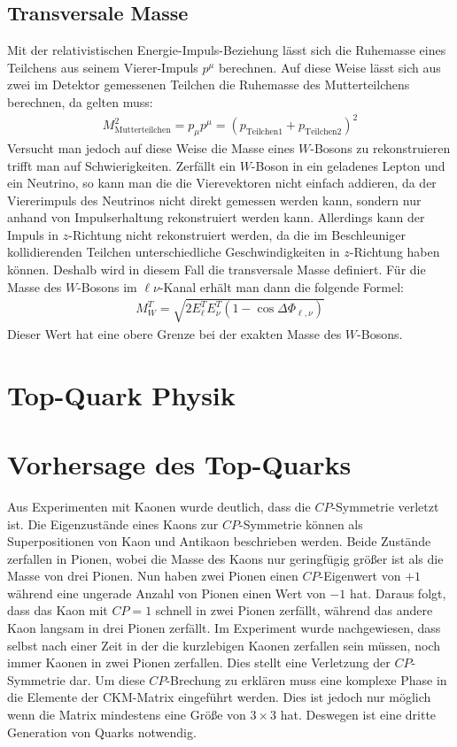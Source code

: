 \subsection{Transversale Masse}
Mit der relativistischen Energie-Impuls-Beziehung lässt sich die Ruhemasse eines Teilchens aus seinem Vierer-Impuls $p^\mu$ berechnen. Auf diese Weise lässt sich aus zwei im Detektor gemessenen Teilchen die Ruhemasse des Mutterteilchens berechnen, da gelten muss:
\begin{align*}
M_{\text{Mutterteilchen}}^2 = p_\mu p^\mu = (p_{\text{Teilchen} 1}+p_{\text{Teilchen} 2})^2
\end{align*}
Versucht man jedoch auf diese Weise die Masse eines $W$-Bosons zu rekonstruieren trifft man auf Schwierigkeiten. Zerfällt ein $W$-Boson in ein geladenes Lepton und ein Neutrino, so kann man die die Vierevektoren nicht einfach addieren, da der Viererimpuls des Neutrinos nicht direkt gemessen werden kann, sondern nur anhand von Impulserhaltung rekonstruiert werden kann. Allerdings kann der Impuls in $z$-Richtung nicht rekonstruiert werden, da die im Beschleuniger kollidierenden Teilchen unterschiedliche Geschwindigkeiten in $z$-Richtung haben können. Deshalb wird in diesem Fall die transversale Masse definiert. Für die Masse des $W$-Bosons im $\ell \nu$-Kanal erhält man dann die folgende Formel:
\begin{align*}
M_W^T = \sqrt{2E_{\ell}^TE_\nu^T\left(1-\cos \Delta\Phi_{\ell,\nu}\right)}
\end{align*}
Dieser Wert hat eine obere Grenze bei der exakten Masse des $W$-Bosons.

\section{Top-Quark Physik}
\section{Vorhersage des Top-Quarks}
Aus Experimenten mit Kaonen wurde deutlich, dass die $CP$-Symmetrie verletzt ist. Die Eigenzustände eines Kaons zur $CP$-Symmetrie können als Superpositionen von Kaon und Antikaon beschrieben werden. Beide Zustände zerfallen in Pionen, wobei die Masse des Kaons nur geringfügig größer ist als die Masse von drei Pionen. Nun haben zwei Pionen einen $CP$-Eigenwert von $+1$ während eine ungerade Anzahl von Pionen einen Wert von $-1$ hat. Daraus folgt, dass das Kaon mit $CP=1$ schnell in zwei Pionen zerfällt, während das andere Kaon langsam in drei Pionen zerfällt. Im Experiment wurde nachgewiesen, dass selbst nach einer Zeit in der die kurzlebigen Kaonen zerfallen sein müssen, noch immer Kaonen in zwei Pionen zerfallen. Dies stellt eine Verletzung der $CP$-Symmetrie dar. Um diese $CP$-Brechung zu erklären muss eine komplexe Phase in die Elemente der CKM-Matrix eingeführt werden. Dies ist jedoch nur möglich wenn die Matrix mindestens eine Größe von $3\times 3$ hat. Deswegen ist eine dritte Generation von Quarks notwendig.
 
